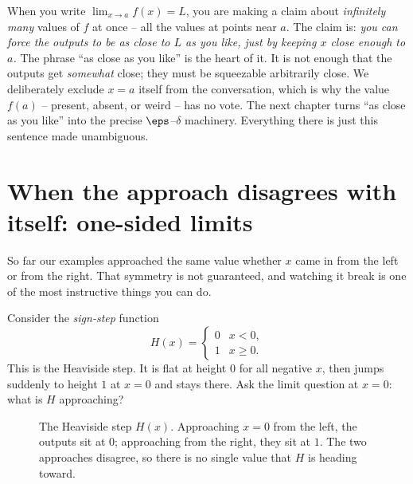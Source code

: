 \begin{happeningbox}
When you write $\lim_{x\to a} f(x) = L$, you are making a claim about \emph{infinitely many}
values of $f$ at once -- all the values at points near $a$. The claim is: \emph{you can force
the outputs to be as close to $L$ as you like, just by keeping $x$ close enough to $a$.} The
phrase ``as close as you like'' is the heart of it. It is not enough that the outputs get
\emph{somewhat} close; they must be squeezable arbitrarily close. We deliberately exclude
$x = a$ itself from the conversation, which is why the value $f(a)$ -- present, absent, or
weird -- has no vote. The next chapter turns ``as close as you like'' into the precise
$\eps$--$\delta$ machinery. Everything there is just this sentence made unambiguous.
\end{happeningbox}

\section{When the approach disagrees with itself: one-sided limits}

So far our examples approached the same value whether $x$ came in from the left or from the
right. That symmetry is not guaranteed, and watching it break is one of the most instructive
things you can do.

Consider the \emph{sign-step} function
\[
  H(x) = \begin{cases} 0 & x < 0, \\[2pt] 1 & x \ge 0. \end{cases}
\]
This is the Heaviside step. It is flat at height $0$ for all negative $x$, then jumps suddenly
to height $1$ at $x = 0$ and stays there. Ask the limit question at $x = 0$: what is $H$
approaching?

\begin{figure}[H]
\centering
{}
\caption{The Heaviside step $H(x)$. Approaching $x=0$ from the left, the outputs sit at $0$;
approaching from the right, they sit at $1$. The two approaches disagree, so there is no single
value that $H$ is heading toward.}
\label{ch05:heaviside}
\end{figure}

